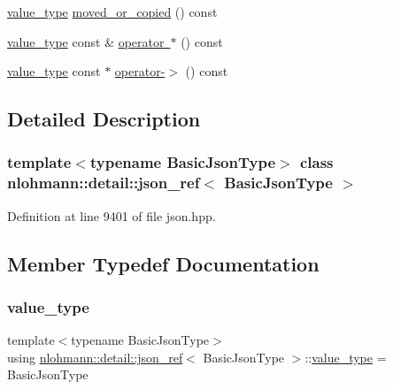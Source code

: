\begin{DoxyCompactItemize}
\item 
\mbox{\hyperlink{classnlohmann_1_1detail_1_1json__ref_a78d76cf288141049568c0d670ed670ef}{value\+\_\+type}} \mbox{\hyperlink{classnlohmann_1_1detail_1_1json__ref_ae39e523218bf05cac3fb5b5b1cd5efb6}{moved\+\_\+or\+\_\+copied}} () const
\item 
\mbox{\hyperlink{classnlohmann_1_1detail_1_1json__ref_a78d76cf288141049568c0d670ed670ef}{value\+\_\+type}} const  \& \mbox{\hyperlink{classnlohmann_1_1detail_1_1json__ref_af96699d7e27c3b1f9d778fe142f8bb41}{operator $\ast$}} () const
\item 
\mbox{\hyperlink{classnlohmann_1_1detail_1_1json__ref_a78d76cf288141049568c0d670ed670ef}{value\+\_\+type}} const  $\ast$ \mbox{\hyperlink{classnlohmann_1_1detail_1_1json__ref_adb652774a67829876449dc0b30637456}{operator-\/$>$}} () const
\end{DoxyCompactItemize}


\subsection{Detailed Description}
\subsubsection*{template$<$typename Basic\+Json\+Type$>$\newline
class nlohmann\+::detail\+::json\+\_\+ref$<$ Basic\+Json\+Type $>$}



Definition at line 9401 of file json.\+hpp.



\subsection{Member Typedef Documentation}
\mbox{\label{classnlohmann_1_1detail_1_1json__ref_a78d76cf288141049568c0d670ed670ef}} 
\subsubsection{\texorpdfstring{value\_type}{value\_type}}
{\footnotesize\ttfamily template$<$typename Basic\+Json\+Type$>$ \\
using \mbox{\hyperlink{classnlohmann_1_1detail_1_1json__ref}{nlohmann\+::detail\+::json\+\_\+ref}}$<$ Basic\+Json\+Type $>$\+::\mbox{\hyperlink{classnlohmann_1_1detail_1_1json__ref_a78d76cf288141049568c0d670ed670ef}{value\+\_\+type}} =  Basic\+Json\+Type}



